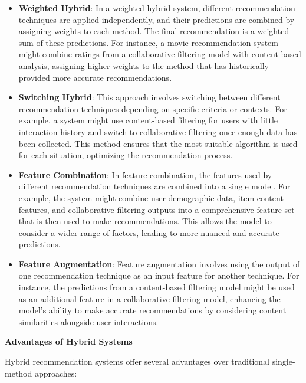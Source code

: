 \documentclass{article}
\begin{document}
\begin{itemize}
    \item \textbf{Weighted Hybrid}: In a weighted hybrid system, different recommendation techniques are applied independently, and their predictions are combined by assigning weights to each method. The final recommendation is a weighted sum of these predictions. For instance, a movie recommendation system might combine ratings from a collaborative filtering model with content-based analysis, assigning higher weights to the method that has historically provided more accurate recommendations.
    \item \textbf{Switching Hybrid}: This approach involves switching between different recommendation techniques depending on specific criteria or contexts. For example, a system might use content-based filtering for users with little interaction history and switch to collaborative filtering once enough data has been collected. This method ensures that the most suitable algorithm is used for each situation, optimizing the recommendation process.
    \item \textbf{Feature Combination}: In feature combination, the features used by different recommendation techniques are combined into a single model. For example, the system might combine user demographic data, item content features, and collaborative filtering outputs into a comprehensive feature set that is then used to make recommendations. This allows the model to consider a wider range of factors, leading to more nuanced and accurate predictions.
    \item \textbf{Feature Augmentation}: Feature augmentation involves using the output of one recommendation technique as an input feature for another technique. For instance, the predictions from a content-based filtering model might be used as an additional feature in a collaborative filtering model, enhancing the model’s ability to make accurate recommendations by considering content similarities alongside user interactions.
\end{itemize}

\textbf{Advantages of Hybrid Systems}

Hybrid recommendation systems offer several advantages over traditional single-method approaches:
\end{document}
